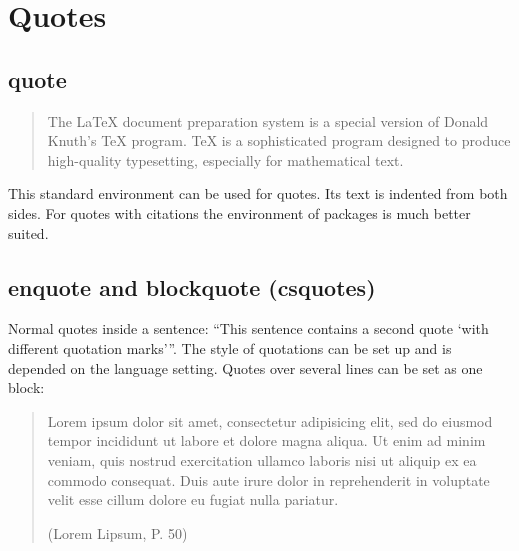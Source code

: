 %

%
\section{Quotes}
\label{sec:demo:quote}

\subsection{quote}

\begin{filecontents*}{\democodefile}
\begin{quote}
The \LaTeX{} document preparation system is a special version of Donald
Knuth's \TeX{} program. \TeX{} is a sophisticated program designed to 
produce high-quality typesetting, especially for mathematical text.
\end{quote}
\end{filecontents*}

This standard environment can be used for quotes. Its text is indented from both sides. For quotes with citations the  environment of packages  is much better suited.

%

\subsection{enquote and blockquote (csquotes)}

\begin{filecontents*}{\democodefile}
Normal quotes inside a sentence: \enquote{This sentence contains a second
quote \enquote{with different quotation marks}}. The style of
quotations can be set up and is depended on the language setting. 
Quotes over several lines can be set as one block: \blockquote[(Lorem Lipsum,
P. 50)]{Lorem ipsum dolor sit amet, consectetur adipisicing elit, sed do
eiusmod tempor incididunt ut labore et dolore magna aliqua. Ut enim ad minim
veniam, quis nostrud exercitation ullamco laboris nisi ut aliquip ex ea
commodo consequat. Duis aute irure dolor in reprehenderit in voluptate velit
esse cillum dolore eu fugiat nulla pariatur.}
\end{filecontents*}

